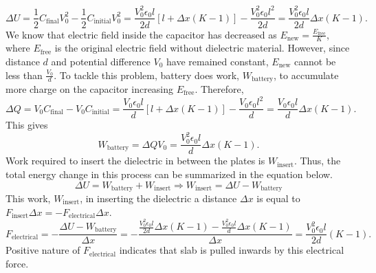 \documentclass{article}
\begin{document}
\[\Delta U=\frac{1}{2}C_{\text{final}}V_0^2-\frac{1}{2}C_{\text{initial}}V_0^2=\frac{V_0^2\epsilon_0l}{2d}[l+\Delta x(K-1)]-\frac{V_0^2\epsilon_0l^2}{2d}=\frac{V_0^2\epsilon_0l}{2d}\Delta x(K-1).\]
We know that electric field inside the capacitor has decreased as $E_{\text{new}}=\frac{E_{\text{free}}}{K}$, where $E_{\text{free}}$ is the original electric field without dielectric material. However, since distance $d$ and potential difference $V_0$ have remained constant, $E_{\text{new}}$ cannot be less than $\frac{V_0}{d}$. To tackle this problem, battery does work, $W_{\text{battery}}$, to accumulate more charge on the capacitor increasing $E_{\text{free}}$. Therefore,
\[\Delta Q=V_0C_\text{final}-V_0C_{\text{initial}}=\frac{V_0\epsilon_0l}{d}[l+\Delta x(K-1)]-\frac{V_0\epsilon_0l^2}{d}=\frac{V_0\epsilon_0l}{d}\Delta x(K-1).\]
This gives
\[W_{\text{battery}}=\Delta QV_0=\frac{V_0^2\epsilon_0l}{d}\Delta x(K-1).\]
Work required to insert the dielectric in between the plates is $W_{\text{insert}}$. Thus, the total energy change in this process can be summarized in the equation below.
\[\Delta U=W_{\text{battery}}+W_{\text{insert}}\Rightarrow W_{\text{insert}}=\Delta U-W_{\text{battery}}\]
This work, $W_{\text{insert}}$, in inserting the dielectric a distance $\Delta x$ is equal to $F_{\text{insert}}\Delta x=-F_{\text{electrical}}\Delta x$.
\[F_{\text{electrical}}=-\frac{\Delta U-W_{\text{battery}}}{\Delta x}=-\frac{\frac{V_0^2\epsilon_0l}{2d}\Delta x(K-1)-\frac{V_0^2\epsilon_0l}{d}\Delta x(K-1)}{\Delta x}=\frac{V_0^2\epsilon_0l}{2d}(K-1).\]
Positive nature of $F_{\text{electrical}}$ indicates that slab is pulled inwards by this electrical force.
\end{document}

